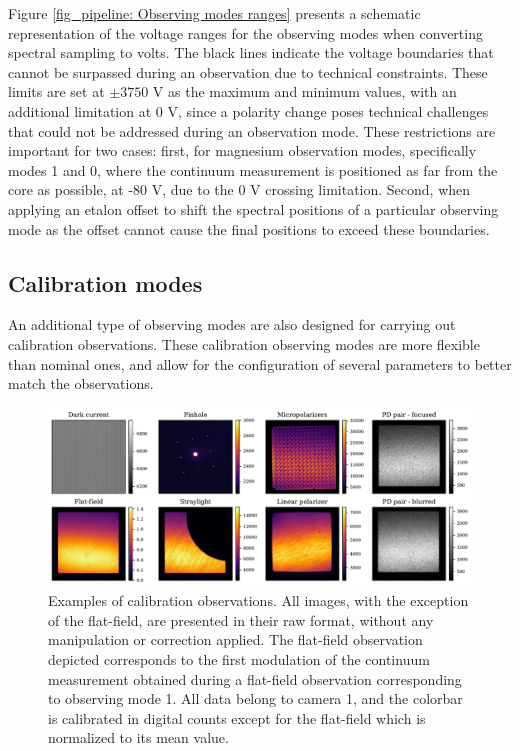 Figure \ref{fig_pipeline: Observing modes ranges} presents a schematic representation of the voltage ranges for the observing modes when converting spectral sampling to volts. The black lines indicate the voltage boundaries that cannot be surpassed during an observation due to technical constraints. These limits are set at $\pm 3750$ V as the maximum and minimum values, with an additional limitation at 0 V, since a polarity change poses technical challenges that could not be addressed during an observation mode. These restrictions are important for two cases: first, for magnesium observation modes, specifically modes 1 and 0, where the continuum measurement is positioned as far from the core as possible, at -80 V, due to the 0 V crossing limitation. Second, when applying an etalon offset to shift the spectral positions of a particular observing mode as the offset cannot cause the final positions to exceed these boundaries.

\subsection{Calibration modes}
An additional type of observing modes are also designed for carrying out calibration observations. These calibration observing modes are more flexible than nominal ones, and allow for the configuration of several parameters to better match the observations.

\begin{figure}[t]
    \includegraphics[width=\textwidth]{figures/Pipeline/cal_modes_examples.pdf}
    \caption[Calibration observation modes examples of TuMag.]{
      Examples of calibration observations. All images, with the exception of the flat-field, are presented in their raw format, without any manipulation or correction applied. The flat-field observation depicted corresponds to the first modulation of the continuum measurement obtained during a flat-field observation corresponding to observing mode 1. All data belong to camera 1, and the colorbar is calibrated in digital counts except for the flat-field which is normalized to its mean value. }
      \label{fig_pipeline: cal_examples}
\end{figure}

